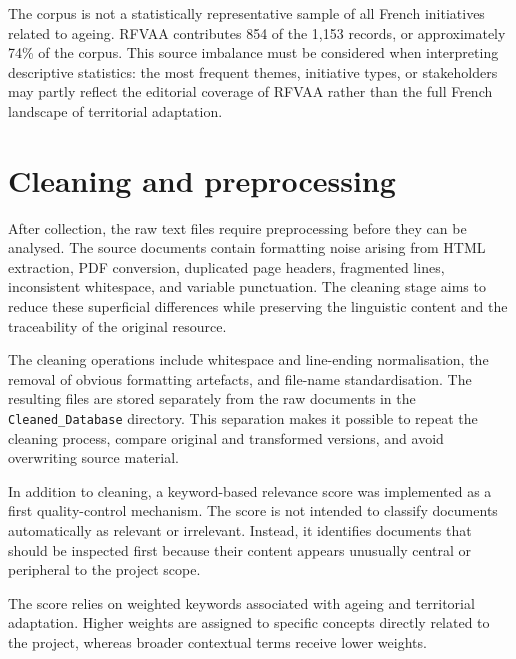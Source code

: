 \documentclass[
11pt,
english,
singlespacing,
headsepline,
]{MastersDoctoralThesis}
\begin{document}
The corpus is not a statistically representative sample of all French
initiatives related to ageing. RFVAA contributes 854 of the 1,153 records, or
approximately 74\% of the corpus. This source imbalance must be considered when
interpreting descriptive statistics: the most frequent themes, initiative types,
or stakeholders may partly reflect the editorial coverage of RFVAA rather than
the full French landscape of territorial adaptation.

\section{Cleaning and preprocessing}

After collection, the raw text files require preprocessing before they can be
analysed. The source documents contain formatting noise arising from HTML
extraction, PDF conversion, duplicated page headers, fragmented lines,
inconsistent whitespace, and variable punctuation. The cleaning stage aims to
reduce these superficial differences while preserving the linguistic content and
the traceability of the original resource.

The cleaning operations include whitespace and line-ending normalisation, the
removal of obvious formatting artefacts, and file-name standardisation. The
resulting files are stored separately from the raw documents in the
\texttt{Cleaned\_Database} directory. This separation makes it possible to
repeat the cleaning process, compare original and transformed versions, and
avoid overwriting source material.

In addition to cleaning, a keyword-based relevance score was implemented as a
first quality-control mechanism. The score is not intended to classify documents
automatically as relevant or irrelevant. Instead, it identifies documents that
should be inspected first because their content appears unusually central or
peripheral to the project scope.

The score relies on weighted keywords associated with ageing and territorial
adaptation. Higher weights are assigned to specific concepts directly related to
the project, whereas broader contextual terms receive lower weights.
\end{document}
